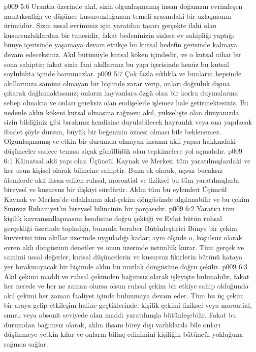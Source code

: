 \vs p009 5:6 Urantia üzerinde akıl, sizin olgunlaşmamış insan doğanızın evrimleşen mantıksallığı ve düşünce kusursuzluğunun temeli arasındaki bir uzlaşmanın ürünüdür. Sizin ussal evriminiz için yaratılan tasarı gerçekte ilahi olan kusursuzluklardan bir tanesidir, fakat bedeninizin sizlere ev sahipliği yaptığı bünye içerisinde yaşamaya devam ettikçe bu kutsal hedefin gerisinde kalmaya devam edeceksiniz. Akıl bütünüyle kutsal köken içindedir, ve o kutsal nihai bir sona sahiptir; fakat sizin fani akıllarınız bu yapı içerisinde henüz bu kutsal soylulukta içinde barınmazlar.
\vs p009 5:7 Çok fazla sıklıkla ve bunların hepsinde akıllarınıza samimi olmayan bir biçimde zarar verip, onları doğruluk dışına çıkarak dağlamaktasınız; onların hayvanlara özgü olan bir korku duymalarına sebep olmakta ve onları gereksiz olan endişelerle işlemez hale getirmektesiniz. Bu nedenle aklın kökeni kutsal olmasına rağmen; akıl, yükselişte olan dünyanızda sizin bildiğiniz gibi bırakınız kendisine duyulabilecek hayranlık veya ona yapılacak ibadet şöyle dursun, büyük bir beğeninin öznesi olması bile beklenemez. Olgunlaşmamış ve etkin bir durumda olmayan insanın akli yapısı hakkındaki düşünceler sadece teması alçak gönüllülük olan tepkimelere yol açmalıdır.
\vs p009 6:1 Kâinatsal akli yapı olan Üçüncül Kaynak ve Merkez; tüm yaratılmışlardaki  ve her usun kişisel olarak bilincine sahiptir. Buna ek olarak, uçsuz bucaksız âlemlerde akıl ihsan edilen ruhsal, morontial ve fiziksel bu tüm yaratılmışlarla bireysel ve kusursuz bir ilişkiyi sürdürür. Aklın tüm bu eylemleri Üçüncül Kaynak ve Merkez’de odaklanan akıl\hyp{}çekim döngüsünde algılanabilir ve bu çekim Sınırsız Ruhaniyet’in bireysel bilincinin bir parçasıdır.
\vs p009 6:2 Yaratıcı tüm kişilik kavramsallaşmasını kendisine doğru çektiği ve Evlat bütün ruhsal gerçekliği üzerinde topladığı, bununla beraber Bütünleştirici Bünye bir çekim kuvvetini tüm akıllar üzerinde uyguladığı kadar; aynı ölçüde o, koşulsuz olarak evren aklı döngüsünü denetler ve onun üzerinde üstünlük kurar. Tüm gerçek ve samimi ussal değerler, kutsal düşüncelerin ve kusursuz fikirlerin bütünü hataya yer bırakmayacak bir biçimde aklın bu mutlak döngüsüne doğru çekilir.
\vs p009 6:3 Akıl çekimi maddi ve ruhsal çekimden bağımsız olarak işleyişte bulunabilir, fakat her nerede ve her ne zaman olursa olsun ruhsal çekim bir etkiye sahip olduğunda akıl çekimi her zaman faaliyet içinde bulunmaya devam eder. Tüm bu üç çekim bir araya gelip etkileşim haline geçtiklerinde, kişilik çekimi fiziksel veya morontial, sınırlı veya absonit seviyede olan maddi yaratılmışla bütünleşebilir. Fakat bu durumdan bağımsız olarak, aklın ihsanı birey dışı varlıklarda bile onları düşünmeye yetkin kılar ve onların bilinç edinimini kişiliğin bütüncül yokluğuna rağmen sağlar.
